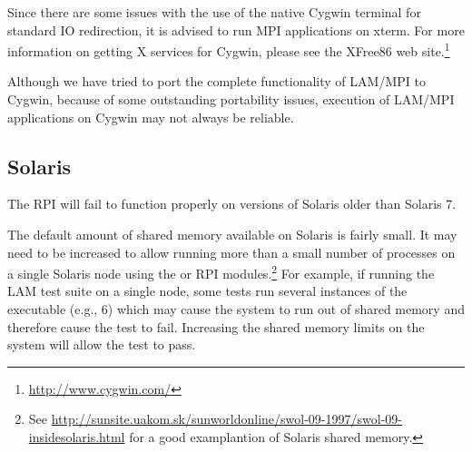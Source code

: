 Since there are some issues with the use of the native Cygwin terminal for
standard IO redirection, it is advised to run MPI applications on xterm.  
For more information on getting X services for Cygwin, please see the
XFree86 web site.\footnote{\url{http://www.cygwin.com/}}

Although we have tried to port the complete functionality of 
LAM/MPI to Cygwin, because of some outstanding portability issues,  
execution of LAM/MPI applications on Cygwin may not always be 
reliable.


\subsection{Solaris}

The  RPI will fail to function properly on versions of Solaris
older than Solaris 7.


The default amount of shared memory available on Solaris is fairly
small.  It may need to be increased to allow running more than a small
number of processes on a single Solaris node using the  or
 RPI modules.\footnote{See
  \url{http://sunsite.uakom.sk/sunworldonline/swol-09-1997/swol-09-insidesolaris.html}
  for a good examplantion of Solaris shared memory.}  For example, if
running the LAM test suite on a single node, some tests run several
instances of the executable (e.g., 6) which may cause the system to
run out of shared memory and therefore cause the test to fail.
Increasing the shared memory limits on the system will allow the test
to pass.



